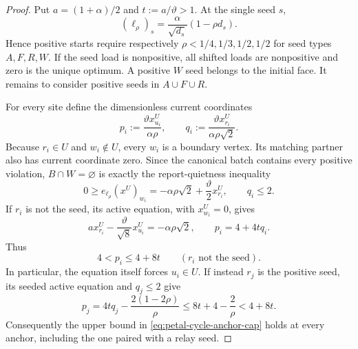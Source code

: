 \begin{proof}
Put $a=(1+\alpha)/2$ and $t:=a/\vartheta>1$.  At the single seed $s$,
\begin{equation*}
 (\ell_\rho)_s
 =\frac{\alpha}{\sqrt{d_s}}(1-\rho d_s).
\end{equation*}
Hence positive starts require respectively
$\rho<1/4,1/3,1/2,1/2$ for seed types $A,F,R,W$.  If the seed load is
nonpositive, all shifted loads are nonpositive and zero is the unique
optimum.  A positive $W$ seed belongs to the initial face.  It remains to
consider positive seeds in $A\cup F\cup R$.

For every site define the dimensionless current coordinates
\begin{equation}
 p_i:=\frac{\vartheta x^U_{u_i}}{\alpha\rho},
 \qquad
 q_i:=\frac{\vartheta x^U_{r_i}}{\alpha\rho\sqrt2}.
 \label{eq:petal-cycle-normalized-anchor-relay}
\end{equation}
Because $r_i\in U$ and $w_i\notin U$, every $w_i$ is a boundary vertex.
Its matching partner also has current coordinate zero.  Since the canonical
batch contains every positive violation, $B\cap W=\varnothing$ is exactly the
report-quietness inequality
\begin{equation*}
 0\geq e_{\ell_\rho}(x^U)_{w_i}
 =-\alpha\rho\sqrt2+\frac{\vartheta}{2}x^U_{r_i},
 \qquad q_i\leq2.
\end{equation*}
If $r_i$ is not the seed, its active equation, with $x^U_{w_i}=0$, gives
\begin{equation}
 a x^U_{r_i}-\frac{\vartheta}{\sqrt8}x^U_{u_i}
 =-\alpha\rho\sqrt2,
 \qquad
 p_i=4+4tq_i.
 \label{eq:petal-cycle-relay-band}
\end{equation}
Thus
\begin{equation}
 4<p_i\leq4+8t
 \qquad(r_i\text{ not the seed}).
 \label{eq:petal-cycle-anchor-cap}
\end{equation}
In particular, the equation itself forces $u_i\in U$.  If instead $r_j$ is
the positive seed, its seeded active equation and $q_j\leq2$ give
\begin{equation*}
 p_j=4tq_j-\frac{2(1-2\rho)}{\rho}
 \leq 8t+4-\frac2\rho<4+8t.
\end{equation*}
Consequently the upper bound in
\cref{eq:petal-cycle-anchor-cap} holds at every anchor, including the one
paired with a relay seed.


\end{proof}
